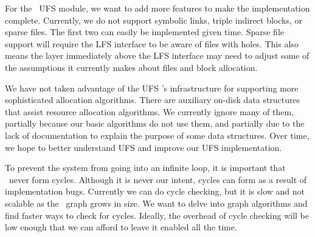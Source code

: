 For the \Kudos\ UFS module, we want to add more features to make the
implementation complete. Currently, we do not support symbolic links, triple
indirect blocks, or sparse files. The first two can easily be implemented
given time. Sparse file support will require the LFS interface to be aware of
files with holes. This also means the layer immediately above the LFS interface
may need to adjust some of the assumptions it currently makes about files and
block allocation.

We have not taken advantage of the UFS \module's infrastructure for supporting
more sophisticated allocation algorithms. There are auxiliary on-disk data
structures that assist resource allocation algorithms. We currently ignore many
of them, partially because our basic algorithms do not use them, and partially
due to the lack of documentation to explain the purpose of some data
structures. Over time, we hope to better understand UFS and improve our UFS
implementation.

To prevent the system from going into an infinite loop, it is important that
\chdescs\ never form cycles. Although it is never our intent, cycles can form
as a result of implementation bugs. Currently we can do cycle checking, but it
is slow and not scalable as the \chdesc\ graph grows in size. We want to delve
into graph algorithms and find faster ways to check for cycles. Ideally, the
overhead of cycle checking will be low enough that we can afford to leave it
enabled all the time.
